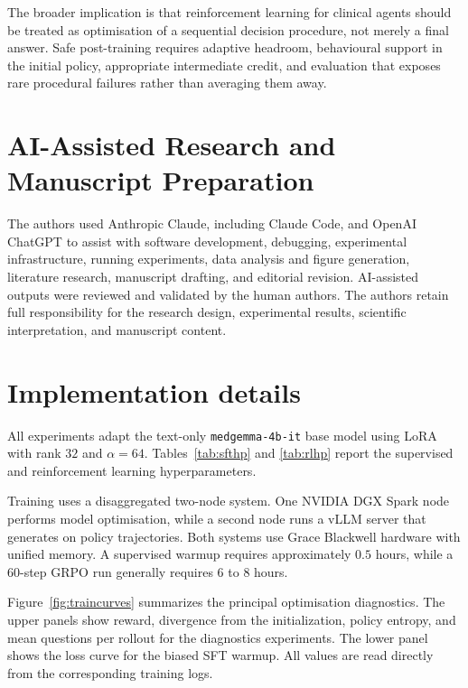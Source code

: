 \documentclass{article}
\begin{document}
The broader implication is that reinforcement learning for clinical agents should
be treated as optimisation of a sequential decision procedure, not merely a final
answer. Safe post-training requires adaptive headroom, behavioural support in the
initial policy, appropriate intermediate credit, and evaluation that exposes rare
procedural failures rather than averaging them away.

\section*{AI-Assisted Research and Manuscript Preparation}

The authors used Anthropic Claude, including Claude Code,
and OpenAI ChatGPT to assist with software development,
debugging, experimental infrastructure, running experiments,
data analysis and figure generation, literature research,
manuscript drafting, and editorial revision.
AI-assisted outputs were reviewed and validated by the
human authors. The authors retain full responsibility for
the research design, experimental results, scientific
interpretation, and manuscript content.

\FloatBarrier
\appendix

\section{Implementation details}
\label{app:impl}

All experiments adapt the text-only \texttt{medgemma-4b-it} base model using
LoRA with rank $32$ and $\alpha{=}64$. Tables~\ref{tab:sfthp} and
\ref{tab:rlhp} report the supervised and reinforcement learning hyperparameters.

Training uses a disaggregated two-node system. One NVIDIA DGX Spark node performs
model optimisation, while a second node runs a vLLM server that generates
on policy trajectories. Both systems use Grace Blackwell hardware with unified
memory. A supervised warmup requires approximately $0.5$ hours, while a
$60$-step GRPO run generally requires $6$ to $8$ hours.

Figure~\ref{fig:traincurves} summarizes the principal optimisation diagnostics.
The upper panels show reward, divergence from the initialization, policy entropy,
and mean questions per rollout for the diagnostics experiments. The lower panel
shows the loss curve for the biased SFT warmup. All values are read directly from
the corresponding training logs.
\end{document}
